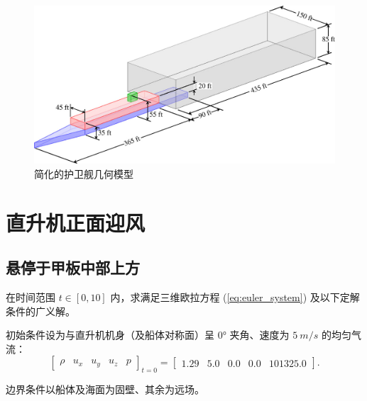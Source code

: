 \begin{figure}[h!]
\begin{centering}
\includegraphics[width=1\textwidth,height=0.4\textheight,keepaspectratio]{figures/ship/simple_frigate.jpeg}
\par\end{centering}
\caption{\label{fig:ship_geometry}简化的护卫舰几何模型}
\end{figure}


\section{直升机正面迎风}

\subsection{悬停于甲板中部上方}
\begin{problem}
[直升机正面迎风悬停于甲板中部上方]\label{prob:=0076F4=005347=00673A=006B63=009762=008FCE=0098CE=0060AC=00505C=004E8E=007532=00677F=004E2D=0090E8=004E0A=0065B9}在时间范围
$t\in[0,10]$ 内，求满足三维欧拉方程 (\ref{eq:euler_system}) 及以下定解条件的广义解。

初始条件设为与直升机机身（及船体对称面）呈 $\ang{0}$ 夹角、速度为 $\SI{5}{m/s}$ 的均匀气流：
\begin{equation}
\begin{bmatrix}\rho & u_{x} & u_{y} & u_{z} & p\end{bmatrix}_{t=0}=\begin{bmatrix}1.29 & 5.0 & 0.0 & 0.0 & 101325.0\end{bmatrix}.
\end{equation}

边界条件以船体及海面为固壁、其余为远场。
\end{problem}

